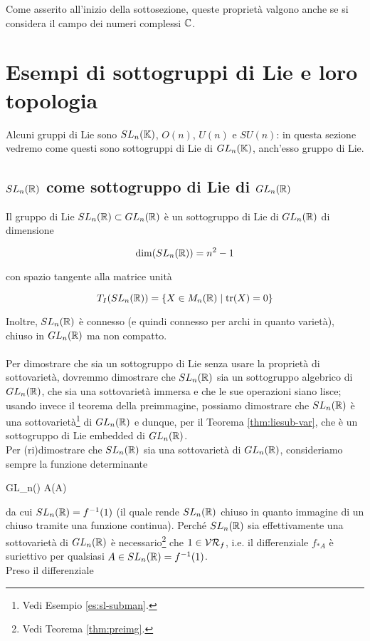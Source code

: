 Come asserito all'inizio della sottosezione, queste proprietà valgono anche se si considera il campo dei numeri complessi $ \mathbb{C} $.

\section{Esempi di sottogruppi di Lie e loro topologia}

Alcuni gruppi di Lie sono $ SL_{n}(\mathbb{K}) $, $ O(n) $, $ U(n) $ e $ SU(n) $: in questa sezione vedremo come questi sono sottogruppi di Lie di $ GL_{n}(\mathbb{K}) $, anch'esso gruppo di Lie.

\subsection{$ SL_{n}(\mathbb{R}) $ come sottogruppo di Lie di $ GL_{n}(\mathbb{R}) $}\label{SL-sublie}

Il gruppo di Lie $ SL_{n}(\mathbb{R}) \subset GL_{n}(\mathbb{R}) $ è un sottogruppo di Lie di $ GL_{n}(\mathbb{R}) $ di dimensione

\begin{equation}
	\dim(SL_{n}(\mathbb{R})) = n^{2} - 1
\end{equation}

con spazio tangente alla matrice unità

\begin{equation}
	T_{I}(SL_{n}(\mathbb{R})) = \{ X \in M_{n}(\mathbb{R}) \mid \tr(X) = 0 \}
\end{equation}

Inoltre, $ SL_{n}(\mathbb{R}) $ è connesso (e quindi connesso per archi in quanto varietà), chiuso in $ GL_{n}(\mathbb{R}) $ ma non compatto.\\\\
%
Per dimostrare che sia un sottogruppo di Lie senza usare la proprietà di sottovarietà, dovremmo dimostrare che $ SL_{n}(\mathbb{R}) $ sia un sottogruppo algebrico di $ GL_{n}(\mathbb{R}) $, che sia una sottovarietà immersa e che le sue operazioni siano lisce; usando invece il teorema della preimmagine, possiamo dimostrare che $ SL_{n}(\mathbb{R}) $ è una sottovarietà\footnote{%
	Vedi Esempio \ref{es:sl-subman}.%
} di $ GL_{n}(\mathbb{R}) $ e dunque, per il Teorema \ref{thm:liesub-var}, che è un sottogruppo di Lie embedded di $ GL_{n}(\mathbb{R}) $.\\
Per (ri)dimostrare che $ SL_{n}(\mathbb{R}) $ sia una sottovarietà di $ GL_{n}(\mathbb{R}) $, consideriamo sempre la funzione determinante

	{GL_{n}(\R)}{\R}
	{A}{\det(A)}
	
da cui $ SL_{n}(\mathbb{R}) = f^{-1}(1) $ (il quale rende $ SL_{n}(\mathbb{R}) $ chiuso in quanto immagine di un chiuso tramite una funzione continua). Perché $ SL_{n}(\mathbb{R}) $ sia effettivamente una sottovarietà di $ GL_{n}(\mathbb{R}) $ è necessario\footnote{%
	Vedi Teorema \ref{thm:preimg}.%
} che $ 1 \in \mathcal{VR}_{f} $, i.e. il differenziale $ f_{*A} $ è suriettivo per qualsiasi $ A \in SL_{n}(\mathbb{R}) = f^{-1}(1) $.\\
Preso il differenziale

